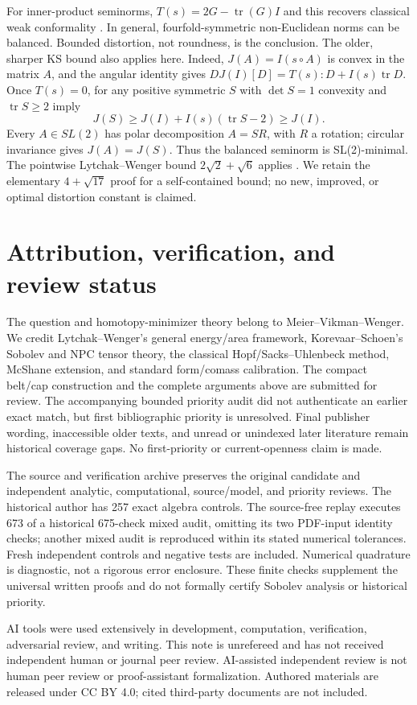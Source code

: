 \documentclass[11pt]{article}
\newcommand{\tr}{\operatorname{tr}}
\begin{document}
For inner-product seminorms, $T(s)=2G-\tr(G)I$ and this recovers classical
weak conformality \cite[Lemma~1.5]{su}. In general, fourfold-symmetric
non-Euclidean norms can be balanced. Bounded distortion, not roundness, is the
conclusion. The older, sharper KS bound also applies here. Indeed,
$J(A)=I(s\circ A)$ is convex in the matrix $A$, and the angular identity gives
$DJ(I)[D]=T(s):D+I(s)\tr D$. Once $T(s)=0$, for any positive symmetric
$S$ with $\det S=1$ convexity and $\tr S\ge2$ imply
\[
 J(S)\ge J(I)+I(s)(\tr S-2)\ge J(I).
\]
Every $A\in SL(2)$ has polar decomposition $A=SR$, with $R$ a rotation;
circular invariance gives $J(A)=J(S)$. Thus the balanced seminorm is
SL(2)-minimal. The pointwise Lytchak--Wenger bound
$2\sqrt2+\sqrt6$ applies \cite[Lemma~3.1 and \S3.3]{lw}.
We retain the elementary $4+\sqrt{17}$ proof for a self-contained bound;
no new, improved, or optimal distortion constant is claimed.

\section*{Attribution, verification, and review status}
The question and homotopy-minimizer theory belong to Meier--Vikman--Wenger.
We credit Lytchak--Wenger's general energy/area framework, Korevaar--Schoen's
Sobolev and NPC tensor theory, the classical Hopf/Sacks--Uhlenbeck method,
McShane extension, and standard form/comass calibration. The compact belt/cap
construction and the complete arguments above are submitted for review.
The accompanying bounded priority audit did not authenticate an earlier exact
match, but first bibliographic priority is unresolved. Final publisher wording,
inaccessible older texts, and unread or unindexed later literature remain
historical coverage gaps. No first-priority or current-openness claim is made.

The source and verification archive preserves the original candidate and
independent analytic, computational, source/model, and priority reviews.
The historical author has 257 exact algebra controls. The source-free replay
executes 673 of a historical 675-check mixed audit, omitting its two PDF-input
identity checks; another mixed audit is reproduced within its stated numerical
tolerances. Fresh independent controls and negative tests are included.
Numerical quadrature is diagnostic, not a rigorous error enclosure. These
finite checks supplement the universal written proofs and do not formally
certify Sobolev analysis or historical priority.

AI tools were used extensively in development, computation, verification,
adversarial review, and writing. This note is unrefereed and has not received
independent human or journal peer review. AI-assisted independent review is
not human peer review or proof-assistant formalization. Authored materials are
released under CC BY 4.0; cited third-party documents are not included.
\end{document}

